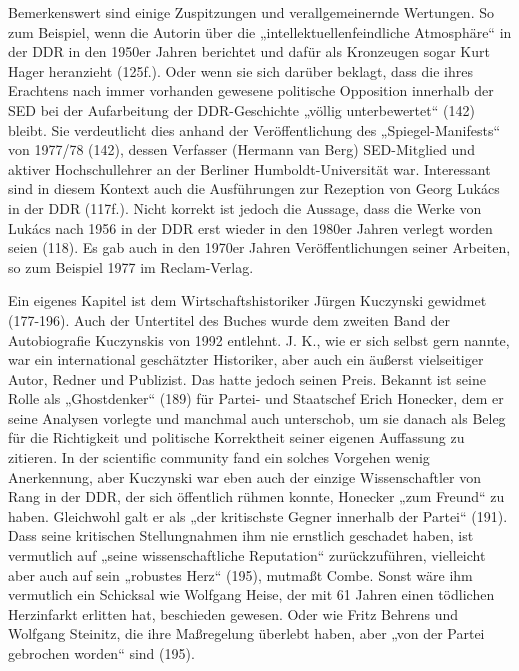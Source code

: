 \begin{multicols*}{2}
    Bemerkenswert sind einige Zuspitzungen und verallgemeinernde Wertungen. So zum Beispiel, wenn die Autorin über die „intellektuellenfeindliche Atmosphäre“ in der DDR in den 1950er Jahren berichtet und dafür als Kronzeugen sogar Kurt Hager heranzieht (125f.). Oder wenn sie sich darüber beklagt, dass die ihres Erachtens nach immer vorhanden gewesene politische Opposition innerhalb der SED bei der Aufarbeitung der DDR-Geschichte „völlig unterbewertet“ (142) bleibt. Sie verdeutlicht dies anhand der Veröffentlichung des „Spiegel-Manifests“ von 1977/78 (142), dessen Verfasser (Hermann van Berg) SED-Mitglied und aktiver Hochschullehrer an der Berliner Humboldt-Universität war. Interessant sind in diesem Kontext auch die Ausführungen zur Rezeption von Georg Lukács in der DDR (117f.). Nicht korrekt ist jedoch die Aussage, dass die Werke von Lukács nach 1956 in der DDR erst wieder in den 1980er Jahren verlegt worden seien (118). Es gab auch in den 1970er Jahren Veröffentlichungen seiner Arbeiten, so zum Beispiel 1977 im Reclam-Verlag. 

    Ein eigenes Kapitel ist dem Wirtschaftshistoriker Jürgen Kuczynski gewidmet (177-196). Auch der Untertitel des Buches wurde dem zweiten Band der Autobiografie Kuczynskis von 1992 entlehnt. J. K., wie er sich selbst gern nannte, war ein international geschätzter Historiker, aber auch ein äußerst vielseitiger Autor, Redner und Publizist. Das hatte jedoch seinen Preis. Bekannt ist seine Rolle als „Ghostdenker“ (189) für Partei- und Staatschef Erich Honecker, dem er seine Analysen vorlegte und manchmal auch unterschob, um sie danach als Beleg für die Richtigkeit und politische Korrektheit seiner eigenen Auffassung zu zitieren. In der scientific community fand ein solches Vorgehen wenig Anerkennung, aber Kuczynski war eben auch der einzige Wissenschaftler von Rang in der DDR, der sich öffentlich rühmen konnte, Honecker „zum Freund“ zu haben. Gleichwohl galt er als „der kritischste Gegner innerhalb der Partei“ (191). Dass seine kritischen Stellungnahmen ihm nie ernstlich geschadet haben, ist vermutlich auf „seine wissenschaftliche Reputation“ zurückzuführen, vielleicht aber auch auf sein „robustes Herz“ (195), mutmaßt Combe. Sonst wäre ihm vermutlich ein Schicksal wie Wolfgang Heise, der mit 61 Jahren einen tödlichen Herzinfarkt erlitten hat, beschieden gewesen. Oder wie Fritz Behrens und Wolfgang Steinitz, die ihre Maßregelung überlebt haben, aber „von der Partei gebrochen worden“ sind (195). 


\end{multicols*}
